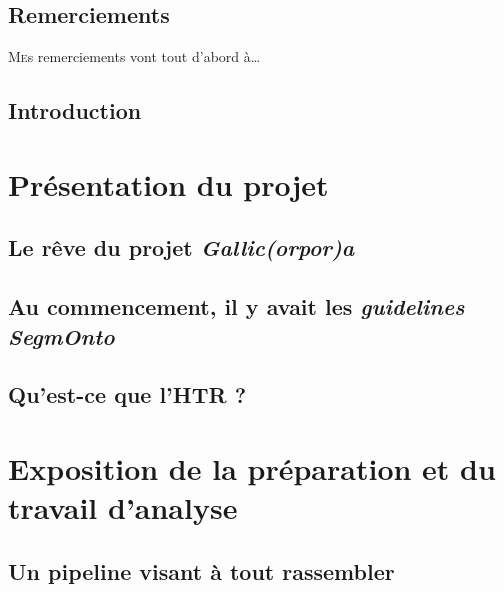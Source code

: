 \documentclass[a4paper,12pt,twoside]{book}
\begin{document}
	
	
	\chapter{Remerciements}
	\lettrine{M}es remerciements vont tout d'abord à\dots
	
	
	\printglossaries
	
	\chapter{Introduction}
	
	
	\thispagestyle{empty}
	\cleardoublepage
	
	\mainmatter
	
	\part{Présentation du projet}
	\label{part1}
	
	\chapter{Le rêve du projet \textit{Gallic(orpor)a}}
	
	\label{chap.3}
	
	\chapter{Au commencement, il y avait les \textit{guidelines SegmOnto}}
	\label{chap:segmonto}
	
	
	\chapter{Qu'est-ce que l'HTR ?}
	
	\label{chap:htr}
	
	\part{Exposition de la préparation et du travail d'analyse}
	\label{part2}

	\chapter{Un pipeline visant à tout rassembler}
	
	\label{chap:pipeline}
	
\end{document}
